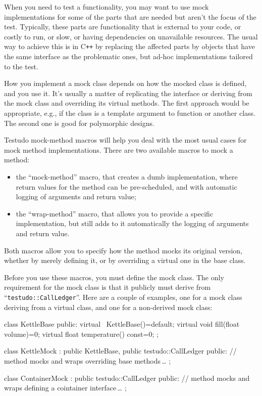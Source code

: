 \documentclass[twoside, a4paper, article]{memoir}
\newcommand*\ellipsis{\,\ldots}
\newcommand*\Cpp{C\texttt{++}}
\begin{document}
When you need to test a functionality, you may want to use mock implementations
for some of the parts that are needed but aren't the focus of the test.
Typically, these parts are functionality that is external to your code, or
costly to run, or slow, or having dependencies on unavailable resources.  The
usual way to achieve this is in \Cpp{} by replacing the affected parts by
objects that have the same interface as the problematic ones, but ad-hoc
implementations tailored to the test.

How you implement a mock class depends on how the mocked class is defined, and
you use it.  It's usually a matter of replicating the interface or deriving
from the mock class and overriding its virtual methods.  The first approach
would be appropriate, e.g., if the class is a template argument to function or
another class.  The second one is good for polymorphic designs.

Testudo mock-method macros will help you deal with the most usual cases for
mock method implementations.  There are two available macros to mock a method:
\begin{itemize}
\item the ``mock-method'' macro, that creates a dumb implementation, where
  return values for the method can be pre-scheduled, and with automatic
  logging of arguments and return value;
\item the ``wrap-method'' macro, that allows you to provide a specific
  implementation, but still adds to it automatically the logging of arguments
  and return value.
\end{itemize}
Both macros allow you to specify how the method mocks its original version,
whether by merely defining it, or by overriding a virtual one in the base
class.

Before you use these macros, you must define the mock class.  The only
requirement for the mock class is that it publicly must derive from
``\texttt{testudo::CallLedger}''.  Here are a couple of examples, one for a
mock class deriving from a virtual class, and one for a non-derived mock class:
\begin{cpplisting}
class KettleBase {
public:
  virtual ~KettleBase()=default;
  virtual void fill(float volume)=0;
  virtual float temperature() const=0;
};

class KettleMock
  : public KettleBase,
    public testudo::CallLedger {
public:
  // method mocks and wraps overriding base methods\ellipsis{}
};

class ContainerMock
  : public testudo::CallLedger {
public:
  // method mocks and wraps defining a cointainer interface\ellipsis{}
};
\end{cpplisting}
\end{document}
